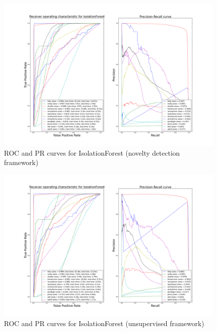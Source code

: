 \begin{figure}[!ht]
  \caption{ROC and PR curves for IsolationForest (novelty detection framework)}
  \label{ocrf:fig:iforest_roc_pr}
  \centering
  \includegraphics[trim=175 80 175 123, clip, width=\linewidth]{fig_source/ocrf_fig/bench_iforest_roc_pr_supervised_factorized.png}
\end{figure}
\begin{figure}[!ht]
  \caption{ROC and PR curves for IsolationForest (unsupervised framework)}
  \label{ocrf:fig:iforest_roc_pr_unsupervised}
  \centering
  \includegraphics[trim=175 80 175 123, clip, width=\linewidth]{fig_source/ocrf_fig/bench_iforest_roc_pr_unsupervised_factorized.png}
\end{figure}

